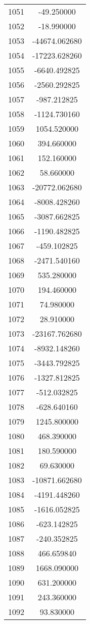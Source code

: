 \documentclass[12pt]{article}
\begin{document}
\begin{longtable}{@{}cc@{}}
1051 & -49.250000 \\
1052 & -18.990000 \\
1053 & -44674.062680 \\
1054 & -17223.628260 \\
1055 & -6640.492825 \\
1056 & -2560.292825 \\
1057 & -987.212825 \\
1058 & -1124.730160 \\
1059 & 1054.520000 \\
1060 & 394.660000 \\
1061 & 152.160000 \\
1062 & 58.660000 \\
1063 & -20772.062680 \\
1064 & -8008.428260 \\
1065 & -3087.662825 \\
1066 & -1190.482825 \\
1067 & -459.102825 \\
1068 & -2471.540160 \\
1069 & 535.280000 \\
1070 & 194.460000 \\
1071 & 74.980000 \\
1072 & 28.910000 \\
1073 & -23167.762680 \\
1074 & -8932.148260 \\
1075 & -3443.792825 \\
1076 & -1327.812825 \\
1077 & -512.032825 \\
1078 & -628.640160 \\
1079 & 1245.800000 \\
1080 & 468.390000 \\
1081 & 180.590000 \\
1082 & 69.630000 \\
1083 & -10871.662680 \\
1084 & -4191.448260 \\
1085 & -1616.052825 \\
1086 & -623.142825 \\
1087 & -240.352825 \\
1088 & 466.659840 \\
1089 & 1668.090000 \\
1090 & 631.200000 \\
1091 & 243.360000 \\
1092 & 93.830000 \\

\end{longtable}
\end{document}
